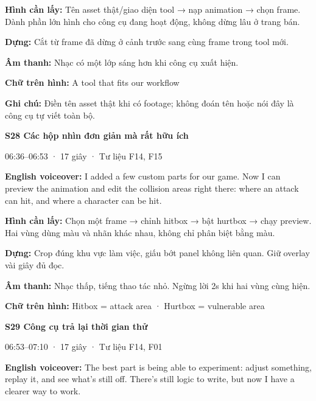 \documentclass[10pt,a4paper]{article}
\begin{document}
\textbf{Hình cần lấy:}  Tên asset thật/giao diện tool → nạp animation → chọn frame. Dành phần lớn hình cho công cụ đang hoạt động, không dừng lâu ở trang bán.\par

\textbf{Dựng:}  Cắt từ frame đã dừng ở cảnh trước sang cùng frame trong tool mới.\par

\textbf{Âm thanh:}  Nhạc có một lớp sáng hơn khi công cụ xuất hiện.\par

\textbf{Chữ trên hình:}  A tool that fits our workflow\par

\textbf{Ghi chú:}  Điền tên asset thật khi có footage; không đoán tên hoặc nói đây là công cụ tự viết toàn bộ.\par

\clearpage

\textbf{S28 Các hộp nhìn đơn giản mà rất hữu ích}\par

06:36–06:53 · 17 giây · Tư liệu F14, F15\par

\textbf{English voiceover:}  I added a few custom parts for our game. Now I can preview the animation and edit the collision areas right there: where an attack can hit, and where a character can be hit.\par

\textbf{Hình cần lấy:}  Chọn một frame → chỉnh hitbox → bật hurtbox → chạy preview. Hai vùng dùng màu và nhãn khác nhau, không chỉ phân biệt bằng màu.\par

\textbf{Dựng:}  Crop đúng khu vực làm việc, giấu bớt panel không liên quan. Giữ overlay vài giây đủ đọc.\par

\textbf{Âm thanh:}  Nhạc thấp, tiếng thao tác nhỏ. Ngừng lời 2s khi hai vùng cùng hiện.\par

\textbf{Chữ trên hình:}  Hitbox = attack area · Hurtbox = vulnerable area\par

\textbf{S29 Công cụ trả lại thời gian thử}\par

06:53–07:10 · 17 giây · Tư liệu F14, F01\par

\textbf{English voiceover:}  The best part is being able to experiment: adjust something, replay it, and see what’s still off. There’s still logic to write, but now I have a clearer way to work.\par
\end{document}
